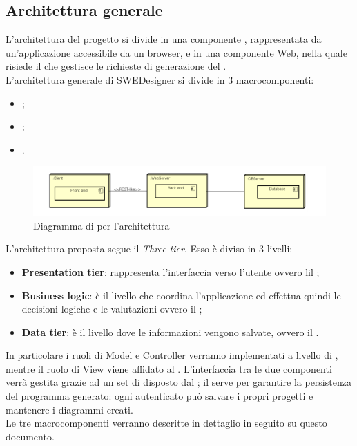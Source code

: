 	\subsection{Architettura generale}
	\label{3.2}
	L'architettura del progetto si divide in una componente , rappresentata da un'applicazione
 accessibile da un browser, e in una componente Web, nella quale risiede il  che gestisce le richieste di generazione del .\\
L'architettura generale di SWEDesigner si divide in 3 macrocomponenti:
\begin{itemize}
\item \textbf{};
\item \textbf{ };
\item \textbf{}.
\end{itemize}

 \begin{figure}[h!]
\centering
\includegraphics[scale=0.4]{Disegnetti/architetturaGenerale.png}
\caption{Diagramma di  per l'architettura}
 \end{figure}

L'architettura proposta segue il  \emph{Three-tier}. Esso è diviso in 3 livelli:
\begin{itemize}
\item \textbf{Presentation tier}: rappresenta l'interfaccia verso l'utente ovvero lil ;
\item \textbf{Business logic}: è il livello che coordina l'applicazione ed effettua quindi le decisioni logiche e le valutazioni ovvero il ;
\item \textbf{Data tier}: è il livello dove le informazioni vengono salvate, ovvero il .
\end{itemize}


In particolare i ruoli di Model e Controller verranno implementati a livello di , mentre il ruolo di View viene affidato al . L'interfaccia tra le due componenti verrà gestita grazie ad un set di  disposto dal  ; il  serve per garantire la persistenza del programma generato: ogni  autenticato può salvare i propri progetti e mantenere i diagrammi creati.\\
Le tre macrocomponenti verranno descritte in dettaglio in seguito su questo documento.
